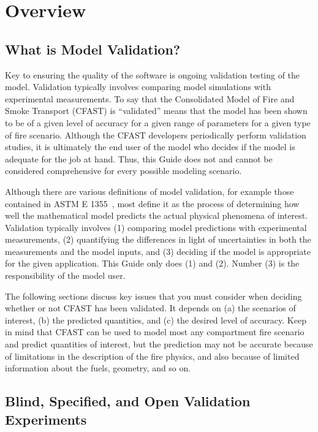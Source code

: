 
\chapter{Overview}



\section{What is Model Validation?}

Key to ensuring the quality of the software is ongoing validation testing of the model. Validation typically involves comparing model simulations with experimental measurements. To say that the Consolidated Model of Fire and Smoke Transport (CFAST) is ``validated'' means that the model has been shown to be of a given level of accuracy for a given range of parameters for a given type of fire scenario. Although the CFAST developers periodically perform validation studies, it is ultimately the end user of the model who decides if the model is adequate for the job at hand. Thus, this Guide does not and cannot be considered comprehensive for every possible modeling scenario.

Although there are various definitions of model validation, for example those contained in ASTM E 1355~\cite{ASTM:E1355}, most define it as the process of determining how well the mathematical model predicts the actual physical phenomena of interest. Validation typically involves (1) comparing model predictions with experimental measurements, (2) quantifying the differences in light of uncertainties in both the measurements and the model inputs, and (3) deciding if the model is appropriate for the given application. This Guide only does (1) and (2). Number (3) is the responsibility of the model user.

The following sections discuss key issues that you must consider when deciding whether or not CFAST has been validated. It depends on (a) the scenarios of interest, (b) the predicted quantities, and (c) the desired level of accuracy. Keep in mind that CFAST can be used to model most any compartment fire scenario and predict quantities of interest, but the prediction may not be accurate because of limitations in the description of the fire physics, and also because of limited information about the fuels, geometry, and so on.


\section{Blind, Specified, and Open Validation Experiments}

